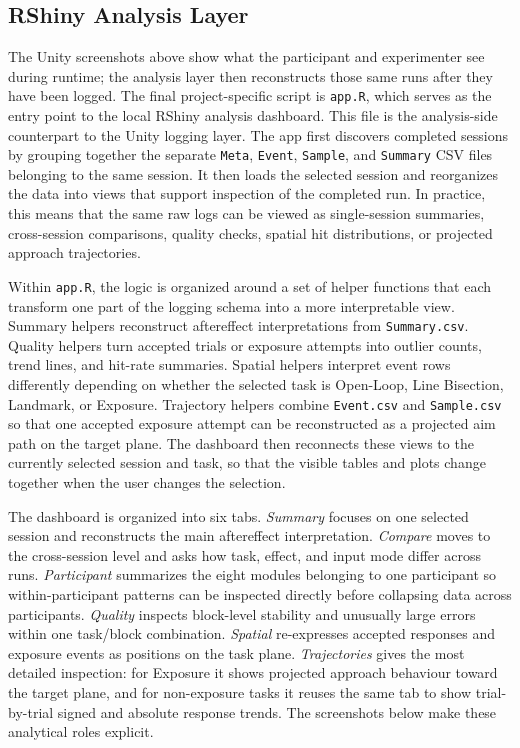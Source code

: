\subsection{RShiny Analysis Layer}
\label{subsec:implementation-rshiny}

The Unity screenshots above show what the participant and experimenter see during runtime; the analysis layer then reconstructs those same runs after they have been logged. The final project-specific script is \texttt{app.R}, which serves as the entry point to the local RShiny analysis dashboard. This file is the analysis-side counterpart to the Unity logging layer. The app first discovers completed sessions by grouping together the separate \texttt{Meta}, \texttt{Event}, \texttt{Sample}, and \texttt{Summary} CSV files belonging to the same session. It then loads the selected session and reorganizes the data into views that support inspection of the completed run. In practice, this means that the same raw logs can be viewed as single-session summaries, cross-session comparisons, quality checks, spatial hit distributions, or projected approach trajectories.

Within \texttt{app.R}, the logic is organized around a set of helper functions that each transform one part of the logging schema into a more interpretable view. Summary helpers reconstruct aftereffect interpretations from \texttt{Summary.csv}. Quality helpers turn accepted trials or exposure attempts into outlier counts, trend lines, and hit-rate summaries. Spatial helpers interpret event rows differently depending on whether the selected task is Open-Loop, Line Bisection, Landmark, or Exposure. Trajectory helpers combine \texttt{Event.csv} and \texttt{Sample.csv} so that one accepted exposure attempt can be reconstructed as a projected aim path on the target plane. The dashboard then reconnects these views to the currently selected session and task, so that the visible tables and plots change together when the user changes the selection.

The dashboard is organized into six tabs. \emph{Summary} focuses on one selected session and reconstructs the main aftereffect interpretation. \emph{Compare} moves to the cross-session level and asks how task, effect, and input mode differ across runs. \emph{Participant} summarizes the eight modules belonging to one participant so within-participant patterns can be inspected directly before collapsing data across participants. \emph{Quality} inspects block-level stability and unusually large errors within one task/block combination. \emph{Spatial} re-expresses accepted responses and exposure events as positions on the task plane. \emph{Trajectories} gives the most detailed inspection: for Exposure it shows projected approach behaviour toward the target plane, and for non-exposure tasks it reuses the same tab to show trial-by-trial signed and absolute response trends. The screenshots below make these analytical roles explicit.

